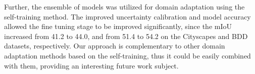 \documentclass[conference]{IEEEtran}
\begin{document}
Further, the ensemble of models was utilized for domain adaptation using the self-training method. The improved uncertainty calibration and model accuracy allowed the fine tuning stage to be improved significantly, since the mIoU increased from 41.2 to 44.0, and from 51.4 to 54.2 on the Cityscapes and BDD datasets, respectively.  Our approach is complementary to other domain adaptation methods based on the self-training, thus it could be easily combined with them, providing an interesting future work subject.



\end{document}
